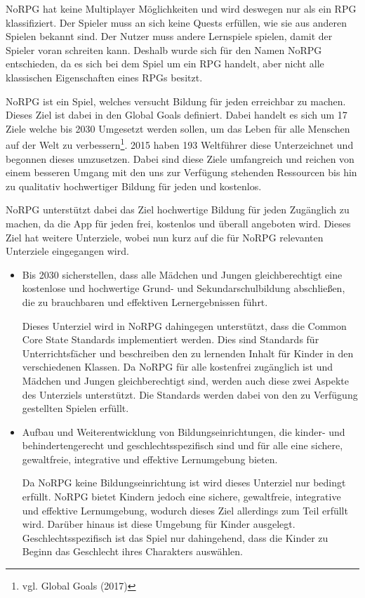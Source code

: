 NoRPG hat keine Multiplayer Möglichkeiten und wird deswegen nur als ein RPG klassifiziert. Der Spieler muss an sich keine Quests erfüllen, wie sie aus anderen Spielen bekannt sind. Der Nutzer muss andere Lernspiele spielen, damit der Spieler voran schreiten kann. Deshalb wurde sich für den Namen NoRPG entschieden, da es sich bei dem Spiel um ein RPG handelt, aber nicht alle klassischen Eigenschaften eines RPGs besitzt.
	
NoRPG ist ein Spiel, welches versucht Bildung für jeden erreichbar zu machen. Dieses Ziel ist dabei in den Global Goals definiert. Dabei handelt es sich um 17 Ziele welche bis 2030 Umgesetzt werden sollen, um das Leben für alle Menschen auf der Welt zu verbessern\footnote{vgl. Global Goals \cite{global} (2017)}. 2015 haben 193 Weltführer diese Unterzeichnet und begonnen dieses umzusetzen. Dabei sind diese Ziele umfangreich und reichen von einem besseren Umgang mit den uns zur Verfügung stehenden Ressourcen bis hin zu qualitativ hochwertiger Bildung für jeden und kostenlos.

NoRPG unterstützt dabei das Ziel hochwertige Bildung für jeden Zugänglich zu machen, da die App für jeden frei, kostenlos und überall angeboten wird. Dieses Ziel hat weitere Unterziele, wobei nun kurz auf die für NoRPG relevanten Unterziele eingegangen wird.

\begin{itemize}
\item Bis 2030 sicherstellen, dass alle Mädchen und Jungen gleichberechtigt eine kostenlose und hochwertige Grund- und Sekundarschulbildung abschließen, die zu brauchbaren und effektiven Lernergebnissen führt.

Dieses Unterziel wird in NoRPG dahingegen unterstützt, dass die Common Core State Standards implementiert werden. Dies sind Standards für Unterrichtsfächer und beschreiben den zu lernenden Inhalt für Kinder in den verschiedenen Klassen. Da NoRPG für alle kostenfrei zugänglich ist und Mädchen und Jungen gleichberechtigt sind, werden auch diese zwei Aspekte des Unterziels unterstützt. Die Standards werden dabei von den zu Verfügung gestellten Spielen erfüllt.

\item Aufbau und Weiterentwicklung von Bildungseinrichtungen, die kinder- und behindertengerecht und geschlechtsspezifisch sind und für alle eine sichere, gewaltfreie, integrative und effektive Lernumgebung bieten. %

Da NoRPG keine Bildungseinrichtung ist wird dieses Unterziel nur bedingt erfüllt. NoRPG bietet Kindern jedoch eine sichere, gewaltfreie, integrative und effektive Lernumgebung, wodurch dieses Ziel allerdings zum Teil erfüllt wird. Darüber hinaus ist diese Umgebung für Kinder ausgelegt. Geschlechtsspezifisch ist das Spiel nur dahingehend, dass die Kinder zu Beginn das Geschlecht ihres Charakters auswählen.

\end{itemize}


